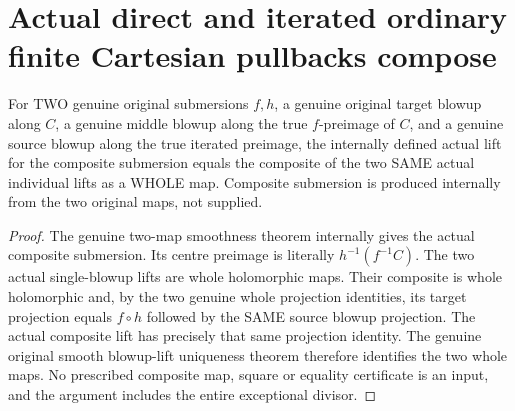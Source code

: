 \section{Actual direct and iterated ordinary finite Cartesian pullbacks compose}

\begin{theorem}
\label{hir:submersion-tower-composition-actual-step}
\leanok
{}
For TWO genuine original submersions $f,h$, a genuine original target
blowup along $C$, a genuine middle blowup along the true $f$-preimage of $C$,
and a genuine source blowup along the true iterated preimage, the internally
defined actual lift for the composite submersion equals the composite of
the two SAME actual individual lifts as a WHOLE map. Composite submersion
is produced internally from the two original maps, not supplied.
\end{theorem}
\begin{proof}
The genuine two-map smoothness theorem internally gives the actual composite
submersion. Its centre preimage is literally $h^{-1}(f^{-1}C)$. The two actual
single-blowup lifts are whole holomorphic maps. Their composite is whole
holomorphic and, by the two genuine whole projection identities, its target
projection equals $f\circ h$ followed by the SAME source blowup projection.
The actual composite lift has precisely that same projection identity.
The genuine original smooth blowup-lift uniqueness theorem therefore identifies
the two whole maps. No prescribed composite map, square or equality certificate
is an input, and the argument includes the entire exceptional divisor.
\end{proof}

